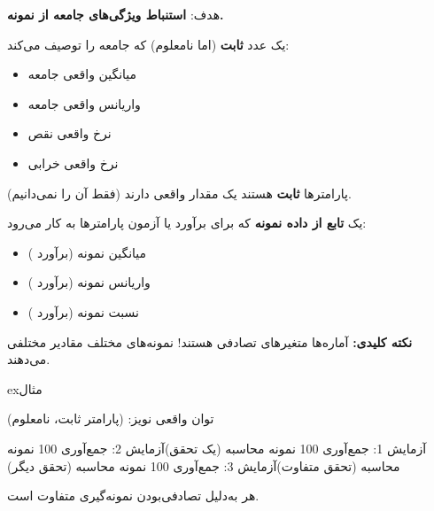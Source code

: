 هدف: \textbf{استنباط ویژگی‌های جامعه از نمونه.}



یک عدد \textbf{ثابت} (اما نامعلوم) که جامعه را توصیف می‌کند:

\begin{itemize}
\tightlist
\item
  \lr{\ensuremath{\mu} =} میانگین واقعی جامعه
\item
   واریانس واقعی جامعه
\item
   نرخ واقعی نقص
\item
  \lr{\ensuremath{\lambda} =} نرخ واقعی خرابی
\end{itemize}

پارامترها \textbf{ثابت} هستند  یک مقدار واقعی دارند (فقط آن را نمی‌دانیم).


یک \textbf{تابع از داده نمونه} که برای برآورد یا آزمون پارامترها به کار می‌رود:

\begin{itemize}
\tightlist
\item
   میانگین نمونه (برآورد \lr{\ensuremath{\mu}})
\item
   واریانس نمونه (برآورد )
\item
   نسبت نمونه (برآورد )
\end{itemize}

\begin{PSquote}

\lr{\PSwarn{}} \textbf{نکته کلیدی:} آماره‌ها متغیرهای تصادفی هستند! نمونه‌های مختلف مقادیر مختلفی می‌دهند.

\end{PSquote}

\begin{PSbox}[unbreakable]{ex}{مثال}

توان واقعی نویز:  (پارامتر  ثابت، نامعلوم)

آزمایش 1: جمع‌آوری 100 نمونه \lr{\ensuremath{\to}} محاسبه  (یک تحقق)\PSbr{}آزمایش 2: جمع‌آوری 100 نمونه \lr{\ensuremath{\to}} محاسبه  (تحقق متفاوت)\PSbr{}آزمایش 3: جمع‌آوری 100 نمونه \lr{\ensuremath{\to}} محاسبه  (تحقق دیگر)

هر  به‌دلیل تصادفی‌بودن نمونه‌گیری متفاوت است.

\end{PSbox}

